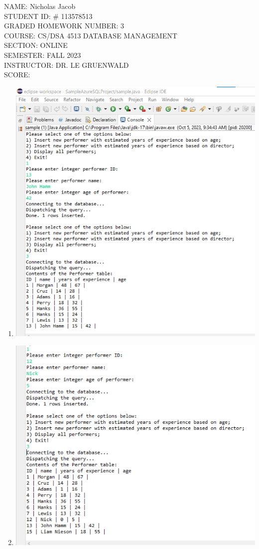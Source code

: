 \documentclass[11pt]{article}
\author{}
\title{}
\begin{document}
{\Large
\noindent NAME:  Nicholas Jacob\\ 
STUDENT ID: \# 113578513\\
GRADED HOMEWORK NUMBER: 3\\
COURSE: CS/DSA 4513 DATABASE MANAGEMENT\\ 
SECTION: ONLINE\\SEMESTER: FALL 2023\\
INSTRUCTOR:  DR. LE GRUENWALD\\
 SCORE:}

\newpage
\begin{enumerate} 
\item \includegraphics[width = \textwidth]{Insert1.png} 
\item \includegraphics[width = \textwidth]{Insert1.1.png}

\end{enumerate}
\end{document}
